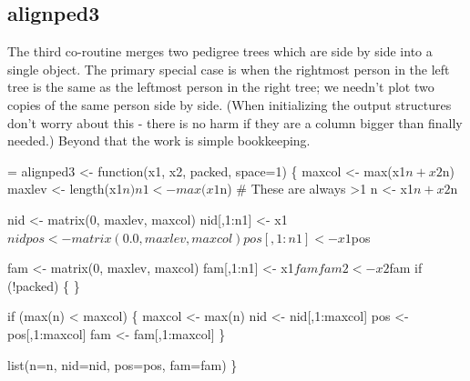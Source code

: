 \documentclass{article}
\begin{document}


\subsection{alignped3}
The third co-routine merges two pedigree trees which are side by
side into a single object.
The primary special case is when the rightmost person in the left
tree is the same as the leftmost person in the right tree; we 
needn't plot two copies of the same person side by side.
(When initializing the output structures don't worry about this - there
is no harm if they are a column bigger than finally needed.)
Beyond that the work is simple bookkeeping.

\begin{nwchunk}
=
 alignped3 <- function(x1, x2, packed, space=1) \{
     maxcol <- max(x1$n + x2$n)
     maxlev <- length(x1$n)
     n1 <- max(x1$n)   # These are always >1
     n  <- x1$n + x2$n
 
     nid <- matrix(0, maxlev, maxcol)
     nid[,1:n1] <- x1$nid
     
     pos <- matrix(0.0, maxlev, maxcol)
     pos[,1:n1] <- x1$pos
 
     fam <- matrix(0, maxlev, maxcol)
     fam[,1:n1] <- x1$fam
     fam2 <- x2$fam
     if (!packed) \{
         \}
 
     if (max(n) < maxcol) \{
         maxcol <- max(n)
         nid <- nid[,1:maxcol]
         pos <- pos[,1:maxcol]
         fam <- fam[,1:maxcol]
         \}
 
     list(n=n, nid=nid, pos=pos, fam=fam)
     \}
\end{nwchunk}
\end{document}
